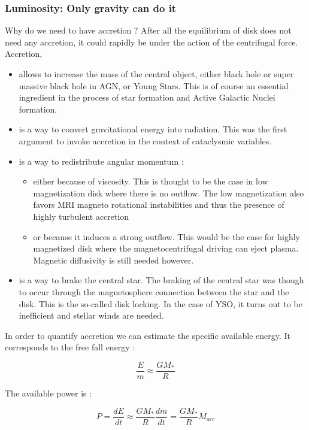 \documentclass[10pt,a4paper]{article}
\begin{document}
\subsubsection{Luminosity: Only gravity can do it}
Why do we need to have accretion ? After all the equilibrium of disk
does not need any accretion, it could rapidly be under the action of
the centrifugal force. \\ 
Accretion, 
\begin{itemize}
\item allows to increase the mass of the central object, either black
  hole or super massive black hole in AGN, or Young Stars. This is of
  course an essential ingredient in the process of star formation and
  Active Galactic Nuclei formation. 
\item is a way to convert gravitational energy into radiation. This
  was the first argument to invoke accretion in the context of
  cataclysmic variables.
\item is a way to redistribute angular momentum : 
  \begin{itemize}
  \item either because of viscosity. This is thought to be the case in
    low magnetization disk where there is no outflow. The low
    magnetization also favors MRI magneto rotational instabilities and
    thus the presence of highly turbulent accretion
  \item or because it induces a strong outflow. This would be the case
    for highly magnetized disk where the magnetocentrifugal driving
    can eject plasma. Magnetic diffusivity is still needed however.
  \end{itemize}
  \item is a way to brake the central star. The braking of the central
    star was though to occur through the magnetosphere connection
    between the star and the disk. This is the so-called disk
    locking. In the case of YSO, it turns out to be inefficient and
    stellar winds are needed. 
\end{itemize}

In order to quantify accretion we can estimate the specific available
energy. It corresponds to the free fall energy : 

\begin{equation}
  \frac{E}{m} \approx \frac{GM_*}{R}
\end{equation}

The available power is :

\begin{equation}
P =\frac{dE}{dt} \approx \frac{GM_*}{R} \frac{dm}{dt} = \frac{GM_*}{R} \dot{M}_{acc}  
\end{equation}
\end{document}

